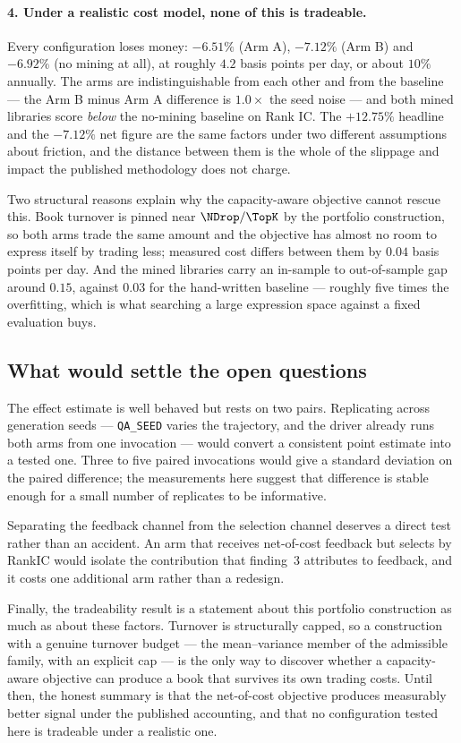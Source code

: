 \paragraph{4. Under a realistic cost model, none of this is tradeable.} Every
configuration loses money: $-6.51\%$ (Arm A), $-7.12\%$ (Arm B) and $-6.92\%$
(no mining at all), at roughly $4.2$ basis points per day, or about $10\%$
annually. The arms are indistinguishable from each other and from the baseline
--- the Arm B minus Arm A difference is $1.0\times$ the seed noise --- and both
mined libraries score \emph{below} the no-mining baseline on Rank IC. The
$+12.75\%$ headline and the $-7.12\%$ net figure are the same factors under two
different assumptions about friction, and the distance between them is the whole
of the slippage and impact the published methodology does not charge.

Two structural reasons explain why the capacity-aware objective cannot rescue
this. Book turnover is pinned near $\NDrop/\TopK$ by the portfolio construction,
so both arms trade the same amount and the objective has almost no room to
express itself by trading less; measured cost differs between them by $0.04$
basis points per day. And the mined libraries carry an in-sample to
out-of-sample gap around $0.15$, against $0.03$ for the hand-written baseline ---
roughly five times the overfitting, which is what searching a large expression
space against a fixed evaluation buys.

\subsection*{What would settle the open questions}

The effect estimate is well behaved but rests on two pairs. Replicating across
generation seeds --- \texttt{QA\_SEED} varies the trajectory, and the driver
already runs both arms from one invocation --- would convert a consistent point
estimate into a tested one. Three to five paired invocations would give a
standard deviation on the paired difference; the measurements here suggest that
difference is stable enough for a small number of replicates to be informative.

Separating the feedback channel from the selection channel deserves a direct
test rather than an accident. An arm that receives net-of-cost feedback but
selects by RankIC would isolate the contribution that finding~3 attributes to
feedback, and it costs one additional arm rather than a redesign.

Finally, the tradeability result is a statement about this portfolio
construction as much as about these factors. Turnover is structurally capped, so
a construction with a genuine turnover budget --- the mean--variance member of
the admissible family, with an explicit cap --- is the only way to discover
whether a capacity-aware objective can produce a book that survives its own
trading costs. Until then, the honest summary is that the net-of-cost objective
produces measurably better signal under the published accounting, and that no
configuration tested here is tradeable under a realistic one.
